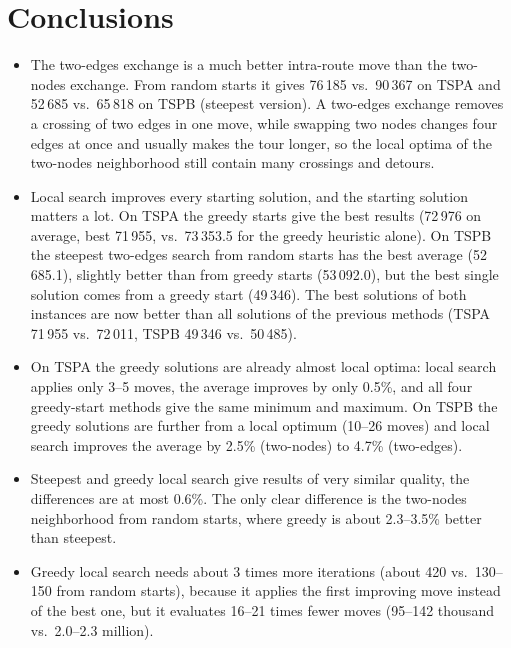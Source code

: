 \documentclass[11pt,a4paper]{article}
\begin{document}
\section{Conclusions}

\begin{itemize}
  \item The two-edges exchange is a much better intra-route move than the two-nodes exchange. From
        random starts it gives 76\,185 vs.\ 90\,367 on TSPA and 52\,685 vs.\ 65\,818 on TSPB (steepest
        version). A two-edges exchange removes a crossing of two edges in one move, while
        swapping two nodes changes four edges at once and usually makes the tour longer, so the
        local optima of the two-nodes neighborhood still contain many crossings and detours.
  \item Local search improves every starting solution, and the starting solution matters a lot.
        On TSPA the greedy starts give the best results (72\,976 on average, best 71\,955, vs.\
        73\,353.5 for the greedy heuristic alone). On TSPB the steepest two-edges search from
        random starts has the best average (52\,685.1), slightly better than from greedy starts
        (53\,092.0), but the best single solution comes from a greedy start (49\,346). The best
        solutions of both instances are now better than all solutions of the previous methods
        (TSPA 71\,955 vs.\ 72\,011, TSPB 49\,346 vs.\ 50\,485).
  \item On TSPA the greedy solutions are already almost local optima: local search applies only 3--5
        moves, the average improves by only 0.5\%, and all four greedy-start methods give the same
        minimum and maximum. On TSPB the greedy solutions are further from a local optimum
        (10--26 moves) and local search improves the average by 2.5\% (two-nodes) to 4.7\%
        (two-edges).
  \item Steepest and greedy local search give results of very similar quality, the differences are
        at most 0.6\%. The only clear difference is the two-nodes neighborhood from random
        starts, where greedy is about 2.3--3.5\% better than steepest.
  \item Greedy local search needs about 3 times more iterations (about 420 vs.\ 130--150 from
        random starts), because it applies the first improving move instead of the best one, but it
        evaluates 16--21 times fewer moves (95--142 thousand vs.\ 2.0--2.3 million).

\end{itemize}
\end{document}
